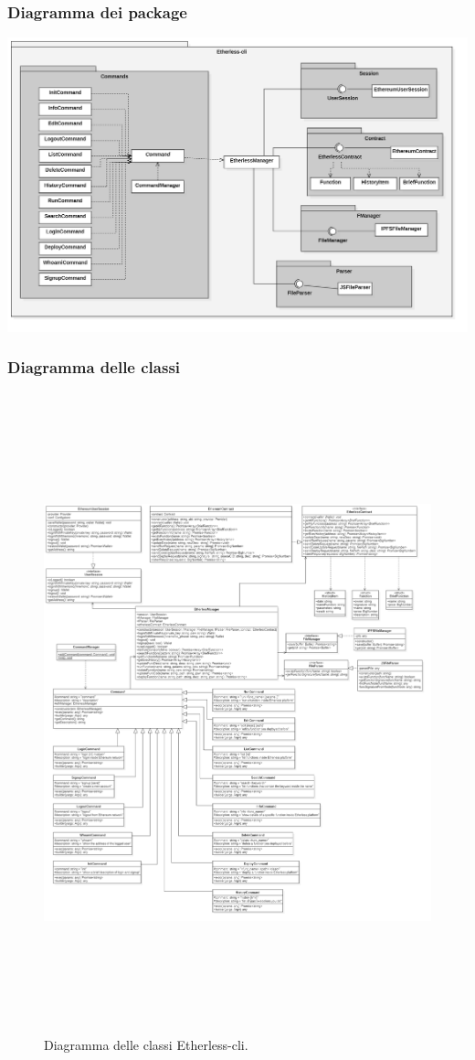 \begin{landscape}
	\subsubsection{Diagramma dei package}
	\centerline{\includegraphics[scale=0.33]{diagrammi/etherless-cli/package.png}}
\end{landscape}

\subsubsection{Diagramma delle classi}
\begin{figure}[H]
	\centerline{\includegraphics[height=18.5cm, width=16cm]{diagrammi/etherless-cli/classi.png}}
	\caption{Diagramma delle classi Etherless-cli.}
\end{figure}
